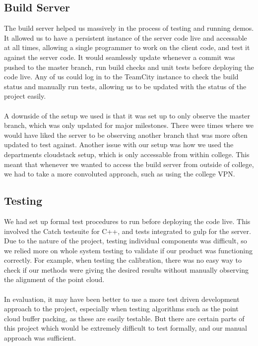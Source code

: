 \documentclass{article}
\begin{document}
\subsection{Build Server}
The build server helped us massively in the process of testing and running demos. It allowed us to have a persistent instance of the server code live and accessable at all times, allowing a single programmer to work on the client code, and test it against the server code. It would seamlessly update whenever a commit was pushed to the master branch, run build checks and unit tests before deploying the code live. Any of us could log in to the TeamCity instance to check the build status and manually run tests, allowing us to be updated with the status of the project easily.
\\\\
A downside of the setup we used is that it was set up to only observe the master branch, which was only updated for major milestones. There were times where we would have liked the server to be observing another branch that was more often updated to test against. Another issue with our setup was how we used the departments cloudstack setup, which is only accessable from within college. This meant that whenever we wanted to access the build server from outside of college, we had to take a more convoluted approach, such as using the college VPN.

\subsection{Testing}
We had set up formal test procedures to run before deploying the code live. This involved the Catch testsuite for C++, and tests integrated to gulp for the server. Due to the nature of the project, testing individual components was difficult, so we relied more on whole system testing to validate if our product was functioning correctly. For example, when testing the calibration, there was no easy way to check if our methods were giving the desired results without manually observing the alignment of the point cloud. 
\\\\
In evaluation, it may have been better to use a more test driven development approach to the project, especially when testing algorithms such as the point cloud buffer packing, as these are easily testable. But there are certain parts of this project which would be extremely difficult to test formally, and our manual approach was sufficient. 
\end{document}
